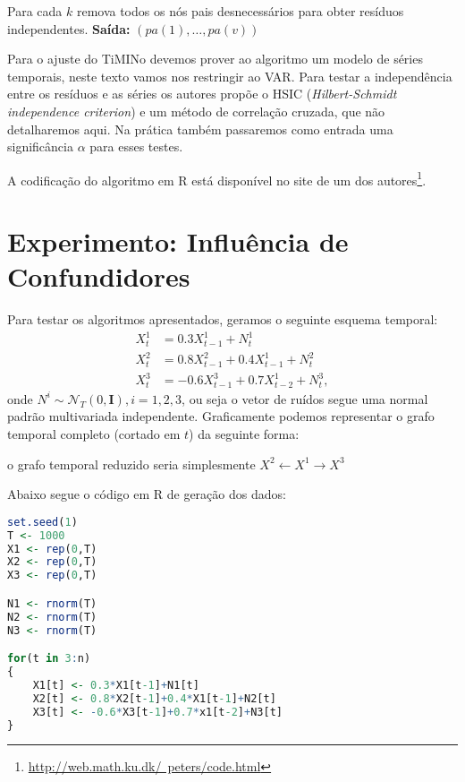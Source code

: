 \documentclass[12pt,letterpaper]{article}
\newcommand{\bd}[1]{\boldsymbol{#1}}
\newcommand{\norm}{\mathcal{N}}
\begin{document}
	Para cada $k$ remova todos os nós pais desnecessários para obter resíduos independentes.
	\textbf{Saída:} $(pa(1),\ldots,pa(v))$
	
	 Para o ajuste do TiMINo devemos prover ao algoritmo um modelo de séries temporais, neste texto vamos nos restringir ao VAR. Para testar a independência entre os resíduos e as séries os autores propõe o HSIC (\textit{Hilbert-Schmidt independence criterion}) e um método de correlação cruzada,  que não detalharemos aqui. Na prática também passaremos como entrada uma significância $\alpha$ para esses testes.
	 
	 A codificação do algoritmo em R está disponível no site de um dos autores\footnote{\href{http://web.math.ku.dk/~peters/code.html}{http://web.math.ku.dk/~peters/code.html}}.
	
	
	\section{Experimento: Influência de Confundidores}
	Para testar os algoritmos apresentados, geramos o seguinte esquema temporal:
	\begin{align*}
		X^1_t &= 0.3X^1_{t-1}+N^1_t\\
		X^2_t &= 0.8X^2_{t-1}+0.4X^1_{t-1}+N^2_t\\
		X^3_t &= -0.6X^3_{t-1}+0.7X^1_{t-2}+N^3_t,
	\end{align*}
onde $N^i\sim \norm_T(0,\bd I),i=1,2,3$, ou seja o vetor de ruídos segue uma normal padrão multivariada independente. Graficamente podemos representar o grafo temporal completo (cortado em $t$) da seguinte forma:
\begin{center}
\end{center}

o grafo temporal reduzido seria simplesmente $X^2\leftarrow X^1\rightarrow X^3$

Abaixo segue o código em R de geração dos dados:

\begin{lstlisting}[language=R]
set.seed(1)
T <- 1000
X1 <- rep(0,T)
X2 <- rep(0,T)
X3 <- rep(0,T)

N1 <- rnorm(T)
N2 <- rnorm(T)
N3 <- rnorm(T)

for(t in 3:n)
{
	X1[t] <- 0.3*X1[t-1]+N1[t]
	X2[t] <- 0.8*X2[t-1]+0.4*X1[t-1]+N2[t]
	X3[t] <- -0.6*X3[t-1]+0.7*x1[t-2]+N3[t]
}
\end{lstlisting}
\end{document}
